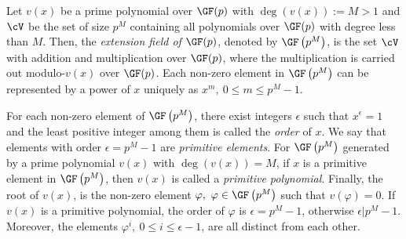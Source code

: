 Let $v(x)$ be a prime polynomial over $\GF(p)$ with $\deg(v(x)):=M>1$ and $\cV$ be the set of size $p^M$ containing all polynomials over $\GF(p)$ with degree less than $M$. Then, the \textit{extension field of $\GF(p)$}, denoted by $\GF\left(p^M\right)$, is the set $\cV$ with addition and multiplication over $\GF(p)$, where the multiplication is carried out modulo-$v(x)$ over $\GF(p)$.
Each non-zero element in $\GF \left(p^M\right)$ can be represented by a power of $x$ uniquely as $x^m,~0 \leq m \leq p^M-1$. %

For each non-zero element of $\GF \left(p^M\right)$, there exist integers $\epsilon$ such that $x^{\epsilon}=1$ and the least positive integer among them is called the \textit{order} of $x$. We say that elements with order $\epsilon=p^M-1$ are \textit{primitive elements}. For $\GF \left(p^M\right)$ generated by a prime polynomial $v(x)$ with $\deg(v(x))=M$, if $x$ is a primitive element in $\GF \left(p^M\right)$, then  $v(x)$ is called a \textit{primitive polynomial}. 
%
Finally, the root of $v(x)$, is the non-zero element $\varphi,~\varphi \in \GF \left(p^M\right)$ such that $v(\varphi)=0$. If $v(x)$ is a primitive polynomial, the order of $\varphi$ is $\epsilon=p^M-1$, otherwise $\epsilon | p^M-1$. 
Moreover, the elements $\varphi^i,~0 \leq i \leq \epsilon -1$, are all distinct from each other.
 

